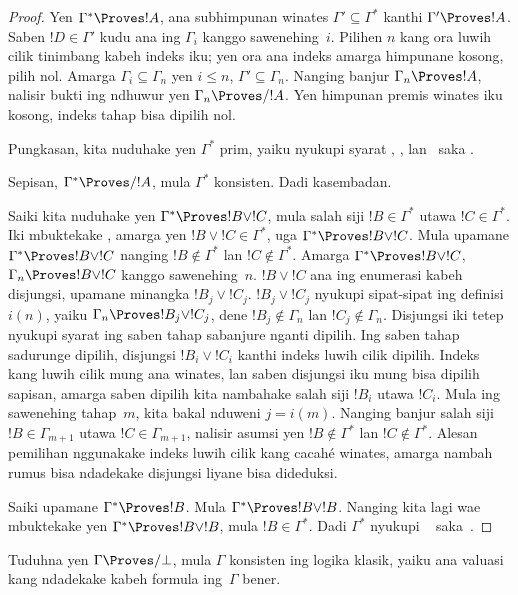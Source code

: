 \documentclass[../../../include/open-logic-section]{subfiles}
\begin{document}
\begin{proof}
  Yen $\Gamma^* \Proves !A$, ana subhimpunan winates
  $\Gamma' \subseteq \Gamma^*$ kanthi $\Gamma' \Proves !A$.
  Saben $!D \in \Gamma'$ kudu ana ing $\Gamma_i$ kanggo sawenehing~$i$.
  Pilihen $n$ kang ora luwih cilik tinimbang kabeh indeks iku;
  yen ora ana indeks amarga himpunane kosong, pilih nol.
  Amarga $\Gamma_i \subseteq \Gamma_n$ yen $i \le n$,
  $\Gamma' \subseteq \Gamma_n$. Nanging banjur $\Gamma_n \Proves !A$,
  nalisir bukti ing ndhuwur yen $\Gamma_n \Proves/ !A$.
Yen himpunan premis winates iku kosong, indeks tahap bisa dipilih nol.

  Pungkasan, kita nuduhake yen $\Gamma^*$ prim, yaiku nyukupi syarat
  , , lan~
  saka .

  Sepisan, $\Gamma^* \Proves/ !A$, mula $\Gamma^*$ konsisten.
  Dadi  kasembadan.

  Saiki kita nuduhake yen $\Gamma^* \Proves !B \lor !C$, mula salah
  siji $!B \in \Gamma^*$ utawa $!C \in \Gamma^*$. Iki mbuktekake
  , amarga yen $!B \lor !C \in \Gamma^*$,
  uga $\Gamma^* \Proves !B \lor !C$. Mula upamane
  $\Gamma^* \Proves !B \lor !C$ nanging $!B \notin \Gamma^*$ lan
  $!C \notin \Gamma^*$. Amarga $\Gamma^* \Proves !B \lor !C$,
  $\Gamma_n \Proves !B \lor !C$ kanggo sawenehing~$n$.
  $!B \lor !C$ ana ing enumerasi kabeh disjungsi, upamane minangka
  $!B_j \lor !C_j$. $!B_j \lor !C_j$ nyukupi sipat-sipat ing definisi
  $i(n)$, yaiku $\Gamma_n \Proves !B_j \lor !C_j$, dene
  $!B_j \notin \Gamma_n$ lan $!C_j \notin \Gamma_n$.
  Disjungsi iki tetep nyukupi syarat ing saben tahap sabanjure nganti
  dipilih. Ing saben tahap sadurunge dipilih, disjungsi $!B_i \lor !C_i$
  kanthi indeks luwih cilik dipilih. Indeks kang luwih cilik mung ana
  winates, lan saben disjungsi iku mung bisa dipilih sapisan, amarga
  saben dipilih kita nambahake salah siji $!B_i$ utawa $!C_i$.
  Mula ing sawenehing tahap~$m$, kita bakal nduweni $j = i(m)$.
  Nanging banjur salah siji $!B \in \Gamma_{m+1}$ utawa
  $!C \in \Gamma_{m+1}$, nalisir asumsi yen $!B \notin \Gamma^*$
  lan $!C \notin \Gamma^*$.
Alesan pemilihan nggunakake indeks luwih cilik kang cacahé winates, amarga nambah rumus bisa ndadekake disjungsi liyane bisa dideduksi.

  Saiki upamane $\Gamma^* \Proves !B$. Mula $\Gamma^* \Proves !B \lor !B$.
  Nanging kita lagi wae mbuktekake yen $\Gamma^* \Proves !B \lor !B$,
  mula $!B \in \Gamma^*$. Dadi $\Gamma^*$ nyukupi
  ~ saka~.
\end{proof}

\begin{prob}
Tuduhna yen $\Gamma \Proves/ \bot$, mula $\Gamma$ konsisten ing logika
klasik, yaiku ana valuasi kang ndadekake kabeh formula ing~$\Gamma$ bener.
\end{prob}
\end{document}
